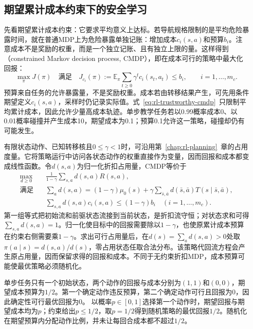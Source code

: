 \subsection{期望累计成本约束下的安全学习}
\label{sec:rl-trustworthy-cmdp}

先看期望累计成本约束：它要求平均意义上达标。若导航规格限制的是平均危险暴露时间，就在普通MDP上为危险暴露单独记账：增加成本$c_i(s,a)$和预算$b_i$。注意成本不是奖励的权重，而是一个独立记账、且有独立上限的量。这样得到（constrained Markov decision process, CMDP），即在成本可行的策略中最大化回报：
\begin{equation}
  \max_\pi J(\pi)
  \quad\text{满足}\quad
  J_{c_i}(\pi):=\mathbb E_\pi\sum_{t\geq0}\gamma^tc_i(s_t,a_t)
       \leq b_i,\qquad i=1,\ldots,m_c.
  \label{eq:rl-trustworthy-cmdp}
\end{equation}
预算来自任务的允许暴露量，不是奖励权重。成本若由转移结果产生，可先用条件期望定义$c_i(s,a)$，采样时仍记录实际值。式~\eqref{eq:rl-trustworthy-cmdp}~只限制平均累计成本，因此允许少量高成本轨迹。单步教学任务若以0.99概率成本0、以0.01概率碰撞并产生成本10，期望成本为0.1；预算0.1允许这一策略，碰撞却仍有可能发生。

有限状态动作、已知转移核且$0\leq\gamma<1$时，可沿用第~\ref{chap:rl-planning}~章的占用度量。它将策略运行中访问各状态动作的权重直接作为变量，因而回报和成本都变成线性函数。令$d(s,a)$为归一化折扣占用量，CMDP等价于
\begin{align}
  \max_{d\geq0}\quad&
       \frac{1}{1-\gamma}\sum_{s,a}d(s,a)R(s,a), \nonumber\\
  \text{满足}\quad&
       \sum_a d(s,a)
       =(1-\gamma)\mu_0(s)
          +\gamma\sum_{\bar s,\bar a}d(\bar s,\bar a)
                   T(s\mid\bar s,\bar a), \nonumber\\
  &\sum_{s,a}d(s,a)c_i(s,a)\leq(1-\gamma)b_i
       \quad (i=1,\ldots,m_c).
  \label{eq:rl-trustworthy-cmdp-lp}
\end{align}
第一组等式把初始流和前驱状态流接到当前状态，是折扣流守恒；对状态求和可得$\sum_{s,a}d(s,a)=1$。归一化使目标中的回报需要除以$1-\gamma$，也使原累计成本预算在约束右侧需要乘$1-\gamma$。求出可行占用量后，在$d(s)=\sum_a d(s,a)>0$处取
$\pi(a\mid s)=d(s,a)/d(s)$，零占用状态任取合法分布。该策略代回流方程会产生原占用量，因而保留求得的回报和成本。不同于无约束折扣MDP，成本预算可能使最优策略必须随机化。

\begin{example}[期望成本预算下的单步随机化]
  \label{ex:rl-trustworthy-randomization}
  单步任务只有一个初始状态，两个动作的回报与成本分别为$(1,1)$和$(0,0)$，期望成本预算为$1/2$。第一个确定动作违反预算，第二个确定动作可行且回报为0，因此确定性可行最优回报为0。
  以概率$p\in[0,1]$选择第一个动作时，期望回报与期望成本均为$p$；约束给出$p\leq1/2$，取$p=1/2$得到随机策略的最优回报$1/2$。随机化在期望预算内分配动作比例，并未让每回合成本都不超过$1/2$。
\end{example}

